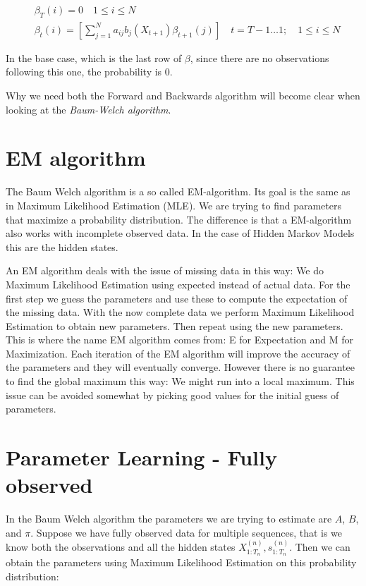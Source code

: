 \begin{equation}
\begin{aligned}
   &\beta_{T}(i)=0 \quad 1 \leq i \leq N  \\
   &\beta_{t}(i)=\left[\sum_{j=1}^{N} a_{i j} b_{j}\left(X_{t+1}\right) \beta_{t+1}(j)\right] \quad t=T-1 \ldots 1 ; \quad 1 \leq i \leq N
   \label{eq:beta-def}
\end{aligned}
\end{equation}

In the base case, which is the last row of $\beta$, since there are no observations following this one, the probability is 0.

Why we need both the Forward and Backwards algorithm will become clear when looking at the \emph{Baum-Welch algorithm}.

\section{EM algorithm}

The Baum Welch algorithm is a so called EM-algorithm. Its goal is the same as in Maximum Likelihood Estimation (MLE). We are trying to find parameters that maximize a probability distribution. The difference is that a EM-algorithm also works with incomplete observed data. In the case of Hidden Markov Models this are the hidden states. 

An EM algorithm deals with the issue of missing data in this way: We do Maximum Likelihood Estimation using expected instead of actual data. For the first step we guess the parameters and use these to compute the expectation of the missing data. With the now complete data we perform Maximum Likelihood Estimation to obtain new parameters. Then repeat using the new parameters. This is where the name EM algorithm comes from: E for Expectation and M for Maximization. Each iteration of the EM algorithm will improve the accuracy of the parameters and they will eventually converge. However there is no guarantee to find the global maximum this way: We might run into a local maximum. This issue can be avoided somewhat by picking good values for the initial guess of parameters. 

\section{Parameter Learning - Fully observed}

In the Baum Welch algorithm the parameters we are trying to estimate are $A$, $B$, and $\pi$. Suppose we have fully observed data for multiple sequences, that is we know both the observations and all the hidden states $X_{1: T_{n}}^{(n)}, s_{1: T_{n}}^{(n)}$. Then we can obtain the parameters using Maximum Likelihood Estimation on this probability distribution:


